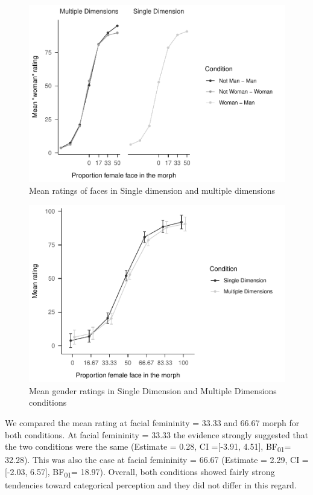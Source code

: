 \documentclass[
  man]{apa7}
\begin{document}
\begin{figure}
\centering
\includegraphics{resp_opts_manus23022_files/figure-latex/descriptives-two-1.pdf}
\caption{\label{fig:descriptives-two}Mean ratings of faces in Single dimension and multiple dimensions}
\end{figure}

\begin{figure}
\centering
\includegraphics{resp_opts_manus23022_files/figure-latex/exp-two-inf-1.pdf}
\caption{\label{fig:exp-two-inf}Mean gender ratings in Single Dimension and Multiple Dimensions conditions}
\end{figure}

We compared the mean rating at facial femininity = 33.33 and 66.67 morph for both conditions. At facial femininity = 33.33 the evidence strongly suggested that the two conditions were the same
(Estimate = 0.28, CI ={[}-3.91, 4.51{]}, BF\textsubscript{01}= 32.28). This was also the case at facial femininity = 66.67
(Estimate = 2.29, CI ={[}-2.03, 6.57{]}, BF\textsubscript{01}= 18.97). Overall, both conditions showed fairly strong tendencies toward categorical perception and they did not differ in this regard.
\end{document}
